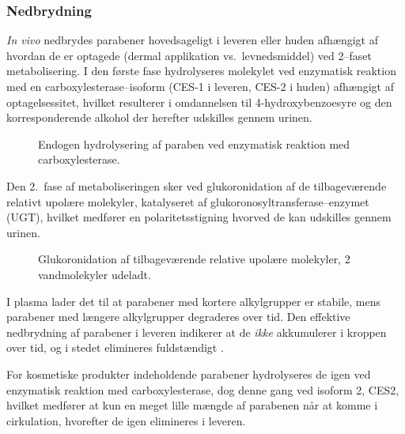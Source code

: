     \subsubsection{Nedbrydning}
    \textit{In vivo} nedbrydes parabener hovedsageligt i leveren eller huden afhængigt af hvordan de er optagede (dermal applikation vs.\ levnedsmiddel) ved 2--faset metabolisering. I den første fase hydrolyseres molekylet ved enzymatisk reaktion med en carboxylesterase--isoform (CES-1 i leveren, CES-2 i huden) afhængigt af optagelsessitet, hvilket resulterer i omdannelsen til 4-hydroxybenzoesyre og den korresponderende alkohol der herefter udskilles gennem urinen.
    \begin{figure}[H]
        \caption{Endogen hydrolysering af paraben ved enzymatisk reaktion med carboxylesterase.}
    \end{figure}
    Den 2.\ fase af metaboliseringen sker ved glukoronidation af de tilbageværende relativt upolære molekyler, katalyseret af glukoronosyltransferase--enzymet (UGT), hvilket medfører en polaritetsstigning hvorved de kan udskilles gennem urinen.
    \begin{figure}[H]
        \caption{Glukoronidation af tilbageværende relative upolære molekyler, 2 vandmolekyler udeladt.}
    \end{figure}
    I plasma lader det til at parabener med kortere alkylgrupper er stabile, mens parabener med længere alkylgrupper degraderes over tid. Den effektive nedbrydning af parabener i leveren indikerer at de \textit{ikke} akkumulerer i kroppen over tid, og i stedet elimineres fuldstændigt \parencite{Suza2010}.

    For kosmetiske produkter indeholdende parabener hydrolyseres de igen ved enzymatisk reaktion med carboxylesterase, dog denne gang ved isoform 2, CES2, hvilket medfører at kun en meget lille mængde af parabenen når at komme i cirkulation, hvorefter de igen elimineres i leveren.

